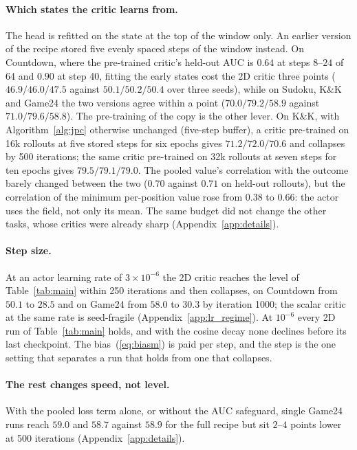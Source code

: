\paragraph{Which states the critic learns from.}
The head is refitted on the state at the top of the window only. An earlier version of the recipe stored five evenly spaced steps of the window instead. On Countdown, where the pre-trained critic's held-out AUC is $0.64$ at steps $8$--$24$ of 64 and $0.90$ at step 40, fitting the early states cost the 2D critic three points ($46.9/46.0/47.5$ against $50.1/50.2/50.4$ over three seeds), while on Sudoku, K\&K and Game24 the two versions agree within a point ($70.0/79.2/58.9$ against $71.0/79.6/58.8$). The pre-training of the copy is the other lever. On K\&K, with Algorithm~\ref{alg:jpc} otherwise unchanged (five-step buffer), a critic pre-trained on 16k rollouts at five stored steps for six epochs gives $71.2/72.0/70.6$ and collapses by 500 iterations; the same critic pre-trained on 32k rollouts at seven steps for ten epochs gives $79.5/79.1/79.0$. The pooled value's correlation with the outcome barely changed between the two ($0.70$ against $0.71$ on held-out rollouts), but the correlation of the minimum per-position value rose from $0.38$ to $0.66$: the actor uses the field, not only its mean. The same budget did not change the other tasks, whose critics were already sharp (Appendix~\ref{app:details}).

\paragraph{Step size.}
At an actor learning rate of $3\times10^{-6}$ the 2D critic reaches the level of Table~\ref{tab:main} within 250 iterations and then collapses, on Countdown from $50.1$ to $28.5$ and on Game24 from $58.0$ to $30.3$ by iteration 1000; the scalar critic at the same rate is seed-fragile (Appendix~\ref{app:lr_regime}). At $10^{-6}$ every 2D run of Table~\ref{tab:main} holds, and with the cosine decay none declines before its last checkpoint. The bias~(\ref{eq:biasm}) is paid per step, and the step is the one setting that separates a run that holds from one that collapses.

\paragraph{The rest changes speed, not level.}
With the pooled loss term alone, or without the AUC safeguard, single Game24 runs reach $59.0$ and $58.7$ against $58.9$ for the full recipe but sit $2$--$4$ points lower at 500 iterations (Appendix~\ref{app:details}).

